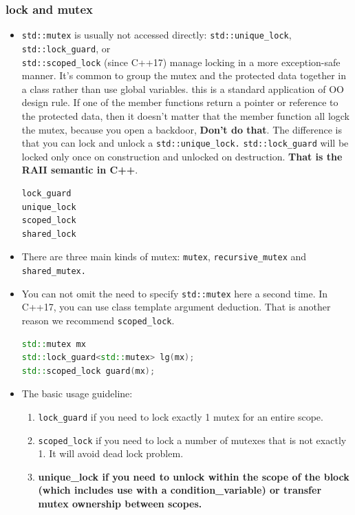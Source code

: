 \documentclass[a4paper,11pt,twoside]{book}
\begin{document}
\subsubsection{lock and mutex}

\begin{itemize}
	\item \texttt{std::mutex} is usually not accessed directly: \texttt{std::unique\_lock}, \texttt{std::lock\_guard}, or \\ 
	\texttt{std::scoped\_lock} (since C++17) manage locking in a more exception-safe manner. It's common to group the mutex and the protected data together in a class rather than use global variables. this is a standard application of OO design rule. If one of the member functions return a pointer or reference to the protected data, then it doesn't matter that the member function all logck the mutex, because you open a backdoor, \textbf{Don't do that}.  The difference is that you can lock and unlock a \texttt{std::unique\_lock.} \texttt{std::lock\_guard} will be locked only once on construction and unlocked on destruction. \textbf{That is the RAII semantic in C++}.
\begin{lstlisting}[frame=single, language=c++]	
lock_guard
unique_lock
scoped_lock
shared_lock	
\end{lstlisting}

		\item There are three main kinds of mutex: \texttt{mutex}, \texttt{recursive\_mutex} and \texttt{shared\_mutex.}

	\item You can not omit the need to specify \texttt{std::mutex} here a second time. In C++17, you can use class template argument deduction. That is another reason we recommend \texttt{scoped\_lock}.
	
\begin{lstlisting}[frame=single, language=c++]
std::mutex mx
std::lock_guard<std::mutex> lg(mx);
std::scoped_lock guard(mx);
\end{lstlisting}



	\item The basic usage guideline:
\begin{enumerate}
	\item \texttt{lock\_guard} if you need to lock exactly 1 mutex for an entire scope.
	\item \texttt{scoped\_lock} if you need to lock a number of mutexes that is not exactly 1. It will avoid dead lock problem.
	\item \textbf{unique\_lock if you need to unlock within the scope of the block (which includes use with a condition\_variable) or transfer mutex ownership between scopes.}
\end{enumerate}


\end{itemize}
\end{document}

